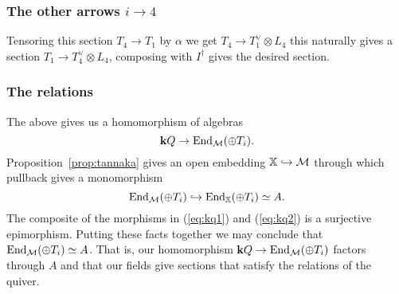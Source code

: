 \documentclass{amsart}
\theoremstyle{definition}
\begin{document}
\subsubsection{The other arrows $i \rightarrow 4$}
Tensoring this section $T_4 \rightarrow T_1$ by $\alpha$ we get $T_4 \rightarrow T_1^\vee \otimes L_4$ this naturally gives a section $T_1 \rightarrow T_4^\vee \otimes L_4$, composing with $I^\dagger$ gives the desired section.

\subsubsection{The relations}

The above gives us a homomorphism of algebras \begin{equation} \label{eq:kq1}
    \mathbf{k} Q \rightarrow \operatorname{End}_{\mathcal{M}}(\oplus T_i).
\end{equation}
Proposition~\ref{prop:tannaka} gives an open embedding $\mathbb{X} \hookrightarrow \mathcal{M}$ through which pullback gives a monomorphism \begin{equation}\label{eq:kq2}
    \operatorname{End}_{\mathcal{M}}(\oplus T_i) \hookrightarrow \operatorname{End}_{\mathbb{X}}(\oplus T_i) \simeq A.
\end{equation}
The composite of the morphisms in (\ref{eq:kq1}) and (\ref{eq:kq2}) is a surjective epimorphism.
Putting these facts together we may conclude that $\operatorname{End}_{\mathcal{M}}(\oplus T_i) \simeq A$.
That is, our homomorphism $\mathbf{k} Q \rightarrow \operatorname{End}_{\mathcal{M}}(\oplus T_i)$ factors through $A$ and that our fields give sections that satisfy the relations of the quiver.



\end{document}
